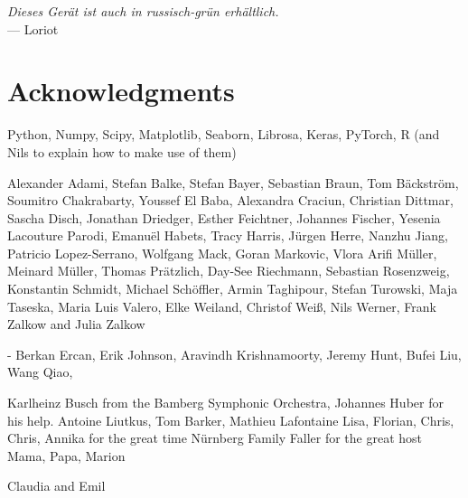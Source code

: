 
\begin{flushright}{\slshape
    Dieses Gerät ist auch in russisch-grün erhältlich.
    }\\ \medskip
    --- Loriot
\end{flushright}



\bigskip

\begingroup
\let\clearpage\relax
\let\cleardoublepage\relax
\let\cleardoublepage\relax
\chapter*{Acknowledgments}

Python, Numpy, Scipy, Matplotlib, Seaborn, Librosa, Keras, PyTorch, R (and Nils to explain how to make use of them)

Alexander Adami, Stefan Balke, Stefan Bayer, Sebastian Braun, Tom Bäckström, Soumitro Chakrabarty, 
Youssef El Baba, Alexandra Craciun, Christian Dittmar, Sascha Disch, Jonathan Driedger, Esther Feichtner, Johannes Fischer, 
Yesenia Lacouture Parodi, Emanuël Habets, Tracy Harris, Jürgen Herre, Nanzhu Jiang, 
Patricio Lopez-Serrano, Wolfgang Mack, Goran Markovic, Vlora Arifi Müller, Meinard Müller, Thomas Prätzlich, 
Day-See Riechmann, Sebastian Rosenzweig, Konstantin Schmidt, Michael Schöffler, Armin Taghipour, 
Stefan Turowski, Maja Taseska, Maria Luis Valero, Elke Weiland, Christof Weiß, Nils Werner, 
Frank Zalkow and Julia Zalkow



- Berkan Ercan, Erik Johnson, Aravindh Krishnamoorty, Jeremy Hunt, Bufei Liu, Wang Qiao, 





\bigskip

\bigskip
Karlheinz Busch from the Bamberg Symphonic Orchestra, Johannes Huber for his help.
Antoine Liutkus, Tom Barker, Mathieu Lafontaine
\bigskip
Lisa, Florian, Chris, Chris, Annika for the great time Nürnberg
\bigskip
Family Faller for the great host
Mama, Papa, Marion

\bigskip

Claudia and Emil

\endgroup
